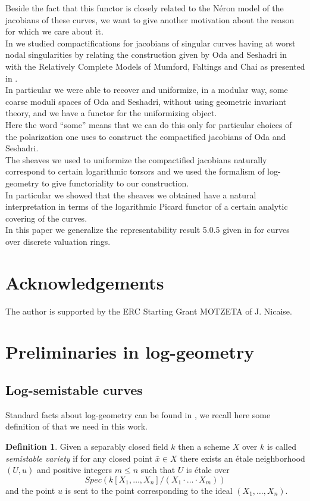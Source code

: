 \documentclass{amsart}
\theoremstyle{definition}
\newtheorem{definition}[thm]{Definition}
\numberwithin{equation}{section}
\begin{document}
\noindent Beside the fact that this functor is closely related to the N\'eron model of the jacobians of these curves, we want to give another motivation about the reason for which we care about it. \\
In \cite{b14} we studied compactifications for jacobians of singular curves having at worst nodal singularities by relating the construction given by Oda and Seshadri in \cite{os} with the Relatively Complete Models of Mumford, Faltings and Chai as presented in \cite{fc}.\\
\noindent In particular we were able to recover and uniformize, in a modular way, some coarse moduli spaces of Oda and Seshadri, without using geometric invariant theory, and we have a functor for the uniformizing object.\\
Here the word ``some'' means that we can do this only for particular choices of the polarization one uses to construct the compactified jacobians of Oda and Seshadri.\\
The sheaves we used to uniformize the compactified jacobians naturally correspond to certain logarithmic torsors and we used the formalism of log-geometry to give functoriality to our construction.\\
In particular we showed that the sheaves we obtained have a natural interpretation in terms of the logarithmic Picard functor of a certain analytic covering of the curves. \\ In this paper we generalize the representability result 5.0.5 given in \cite{b14} for curves over discrete valuation rings.
\section*{Acknowledgements}
\noindent The author is supported by the ERC Starting Grant MOTZETA of J. Nicaise.\\

\section{Preliminaries in log-geometry}
\subsection{Log-semistable curves}\label{lageometrialogaritmica}

Standard facts about log-geometry can be found in \cite{ka}, we recall here some definition of \cite{olpic} that we need in this work.
\begin{definition}
    Given a separably closed field $k$ then a scheme $X$ over $k$ is called \emph{semistable variety} if for any closed point $\bar{x}\in X$ there exists an \'etale neighborhood $(U,u)$ and positive integers $m\leq n$ such that 
$U$ is \'etale over 
$$
Spec(k[X_1,\dots,X_n]/(X_1\cdot \dots \cdot X_m))
$$
\noindent and the point $u$ is sent to the point corresponding to the ideal $(X_1,\dots,X_n)$.
\end{definition}
\end{document}
